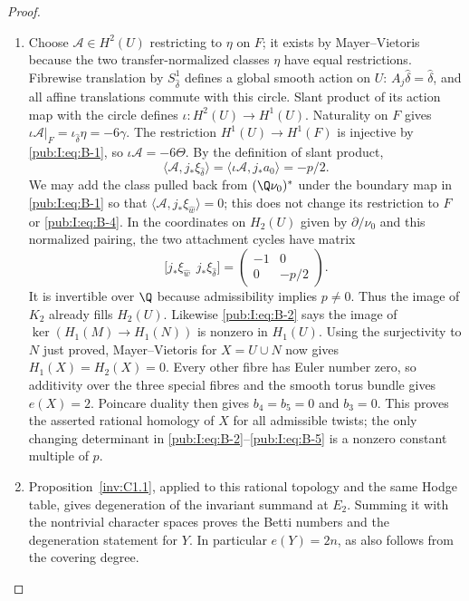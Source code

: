 \begin{proof}
\begin{enumerate}[label=\arabic*.,leftmargin=*]
\item Choose $\mathcal A\in H^2(U)$ restricting to $\eta$ on $F$;
it exists by Mayer--Vietoris because the two transfer-normalized
classes $\eta$ have equal restrictions. Fibrewise translation by
$S^1_{\hat\delta}$ defines a global smooth action on $U$:
$A_j\hat\delta=\hat\delta$, and all affine translations commute
with this circle. Slant product of its action map with the circle
defines $\iota:H^2(U)\to H^1(U)$. Naturality on $F$ gives
$\iota\mathcal A|_F=\iota_{\hat\delta}\eta=-6\gamma$.
The restriction $H^1(U)\to H^1(F)$ is injective by \eqref{pub:I:eq:B-1}, so
$\iota\mathcal A=-6\Theta$. By the definition of slant product,
\begin{equation}
 \langle\mathcal A,j_*\xi_{\hat\delta}\rangle
 =\langle\iota\mathcal A,j_*a_0\rangle=-p/2.
\label{pub:I:eq:B-4}
\end{equation}
We may add the class pulled back from $(\Q\nu_0)^*$ under
the boundary map in \eqref{pub:I:eq:B-1} so that
$\langle\mathcal A,j_*\xi_{\hat w}\rangle=0$;
this does not change its restriction to $F$ or \eqref{pub:I:eq:B-4}.
In the coordinates on $H_2(U)$ given by $\partial/\nu_0$ and
this normalized pairing, the two attachment cycles have
matrix
\begin{equation}
 \bigl[j_*\xi_{\hat w}\ \ j_*\xi_{\hat\delta}\bigr]
 =\begin{pmatrix}-1&0\\0&-p/2\end{pmatrix}.
\label{pub:I:eq:B-5}
\end{equation}
It is invertible over $\Q$ because admissibility implies
$p\ne0$. Thus the image of $K_2$ already fills $H_2(U)$.
Likewise \eqref{pub:I:eq:B-2} says the image of $\ker(H_1(M)\to H_1(N))$
is nonzero in $H_1(U)$. Using the surjectivity to $N$ just proved,
Mayer--Vietoris for $X=U\cup N$ now gives $H_1(X)=H_2(X)=0$.
Every other fibre has Euler number zero, so additivity over the
three special fibres and the smooth torus bundle gives $e(X)=2$.
Poincare duality then gives $b_4=b_5=0$ and $b_3=0$.
This proves the asserted rational homology of $X$ for all admissible
twists; the only changing determinant in \eqref{pub:I:eq:B-2}--\eqref{pub:I:eq:B-5} is a nonzero
constant multiple of $p$. 

\item Proposition~\ref{inv:C1.1}, applied to this rational topology and
the same Hodge table, gives degeneration of the invariant summand at $E_2$.
Summing it with the nontrivial character spaces proves the Betti
numbers and the degeneration statement for $Y$. In particular
$e(Y)=2n$, as also follows from the covering degree.
\end{enumerate}
\end{proof}

